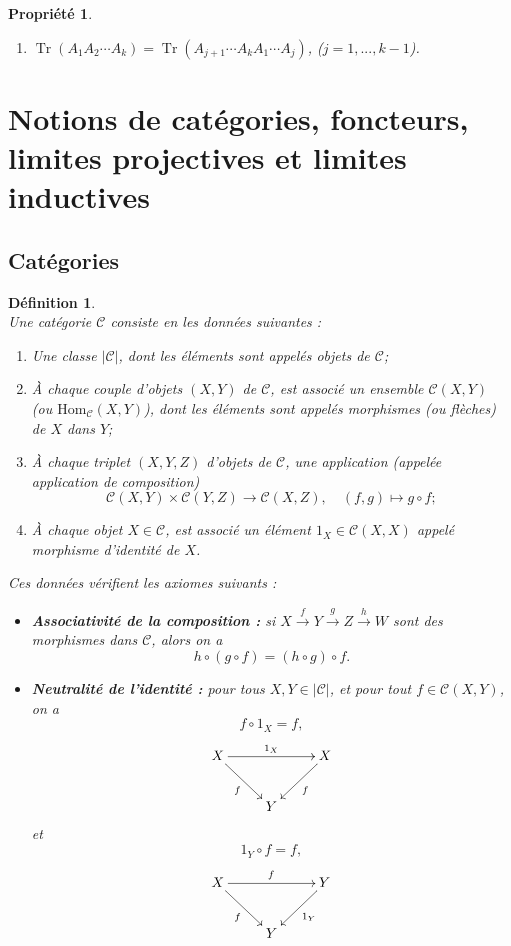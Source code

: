 \documentclass[a4paper, 14pt]{report}
\newtheorem{definition}{Définition}[section]
\newtheorem{propriety}{Propriété}[section]
\begin{document}
\begin{onehalfspace}
{\begin{propriety}
\begin{enumerate}
		\item \( \operatorname{Tr}(A_1 A_2 \cdots A_k) = \operatorname{Tr}(A_{j+1} \cdots A_k A_1 \cdots A_j) \),
		(\(j=1,...,k-1\)).
	\end{enumerate}
\end{propriety}







\section{Notions de catégories, foncteurs, limites projectives et limites inductives}

\subsection{Catégories}

\begin{definition} \cite{maclane1971categories} \\
Une catégorie $\mathcal{C}$ consiste en les données suivantes :
	\begin{enumerate} [label=\roman*)]
		\item Une classe $|\mathcal{C}|$, dont les éléments sont appelés objets de $\mathcal{C}$;
		\item À chaque couple d'objets $(X, Y)$ de $\mathcal{C}$, est associé un ensemble $\mathcal{C}(X, Y)$ (ou $\mathrm{Hom}_{\mathcal{C}}(X, Y)$), dont les éléments sont appelés morphismes (ou flèches) de $X$ dans $Y$;
		\item À chaque triplet $(X, Y, Z)$ d'objets de $\mathcal{C}$, une application (appelée application de composition)
		\[
		\mathcal{C}(X, Y) \times \mathcal{C}(Y, Z) \to \mathcal{C}(X, Z), \quad (f, g) \mapsto g \circ f;
		\]
		\item À chaque objet $X \in \mathcal{C}$, est associé un élément $1_X \in \mathcal{C}(X, X)$ appelé morphisme d'identité de $X$.
	\end{enumerate}
Ces données vérifient les axiomes suivants :
	\begin{itemize}
		\item \textbf{Associativité de la composition :}
		si $X \xrightarrow{f} Y \xrightarrow{g} Z \xrightarrow{h} W$ sont des morphismes dans $\mathcal{C}$, alors on a
		\[
		h \circ (g \circ f) = (h \circ g) \circ f.
		\]
		\item \textbf{Neutralité de l'identité :}
		pour tous $X, Y \in |\mathcal{C}|$, et pour tout $f \in \mathcal{C}(X, Y)$, on a
		\[
		f \circ 1_{X} = f,
		\]
		\[
		\xymatrix{
			X \ar[rr]^{1_{X}} \ar[dr]_{f} & & X \ar[dl]^{f} \\
			& Y &
		}
		\]
		et
		\[
		1_{Y} \circ f = f,
		\]
		\[
		\xymatrix{
			X \ar[rr]^{f} \ar[dr]_{f} & & Y \ar[dl]^{1_{Y}} \\
			& Y &
		}
		\]
	\end{itemize}
\end{definition}

}
\end{onehalfspace}
\end{document}
